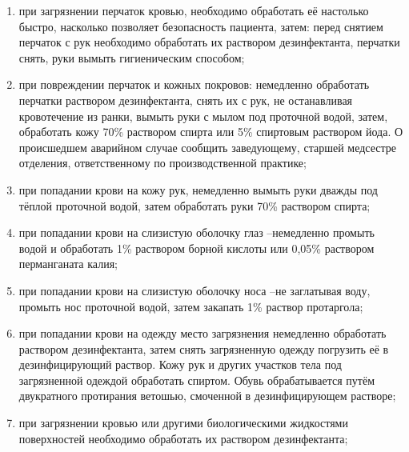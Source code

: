 \documentclass[a4paper,14pt]{extarticle}
\begin{document}
\begin{enumerate}
\begin{enumerate}
\item при загрязнении перчаток кровью, необходимо обработать её настолько быстро, насколько позволяет безопасность пациента, затем: перед снятием перчаток с рук необходимо обработать их раствором дезинфектанта, перчатки снять, руки вымыть гигиеническим способом;
\item при повреждении перчаток и кожных покровов: немедленно обработать перчатки раствором дезинфектанта, снять их с рук, не останавливая кровотечение из ранки, вымыть  руки  с  мылом  под  проточной  водой,  затем,  обработать  кожу  70\% раствором спирта или 5\% спиртовым раствором йода. О происшедшем аварийном случае сообщить заведующему, старшей медсестре отделения, ответственному по производственной практике;
\item при попадании крови на кожу рук, немедленно вымыть руки дважды под тёплой проточной водой, затем обработать руки 70\% раствором спирта;
\item при попадании крови на слизистую оболочку глаз –немедленно промыть водой и обработать  1\%  раствором  борной  кислоты  или    0,05\%  раствором  перманганата калия;
\item при попадании крови на слизистую оболочку носа –не заглатывая воду, промыть нос проточной водой, затем закапать 1\% раствор протаргола;
\item при  попадании  крови  на  одежду  место  загрязнения  немедленно  обработать раствором  дезинфектанта,  затем  снять  загрязненную  одежду    погрузить  её  в дезинфицирующий раствор. Кожу рук и других участков тела под загрязненной одеждой  обработать  спиртом.  Обувь  обрабатывается  путём  двукратного протирания ветошью, смоченной в дезинфицирующем растворе;
\item при загрязнении кровью или другими биологическими жидкостями поверхностей необходимо обработать их раствором дезинфектанта;

\end{enumerate}
\end{enumerate}
\end{document}
